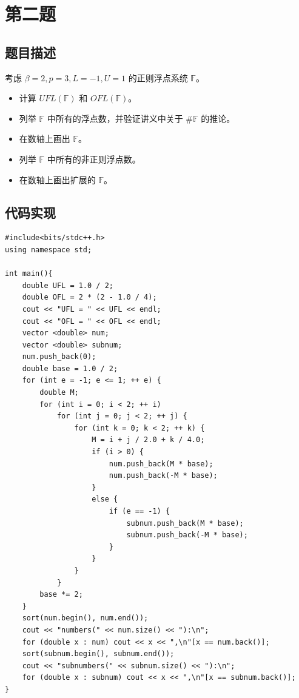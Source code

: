 \documentclass{ctexart}
\begin{document}
\section{第二题}

\subsection{题目描述}
考虑 $\beta=2,p=3,L=-1,U=1$ 的正则浮点系统 $\mathbb{F}$。
\begin{itemize}
\item 计算 $UFL(\mathbb{F})$ 和 $OFL(\mathbb{F})$。
\item 列举 $\mathbb{F}$ 中所有的浮点数，并验证讲义中关于 $\#\mathbb{F}$ 的推论。
\item 在数轴上画出 $\mathbb{F}$。
\item 列举 $\mathbb{F}$ 中所有的非正则浮点数。
\item 在数轴上画出扩展的 $\mathbb{F}$。
\end{itemize}

\subsection{代码实现}
\begin{verbatim}
#include<bits/stdc++.h>
using namespace std;

int main(){
    double UFL = 1.0 / 2;
    double OFL = 2 * (2 - 1.0 / 4);
    cout << "UFL = " << UFL << endl;
    cout << "OFL = " << OFL << endl;
    vector <double> num;
    vector <double> subnum;
    num.push_back(0);
    double base = 1.0 / 2;
    for (int e = -1; e <= 1; ++ e) {
        double M;
        for (int i = 0; i < 2; ++ i)
            for (int j = 0; j < 2; ++ j) {
                for (int k = 0; k < 2; ++ k) {
                    M = i + j / 2.0 + k / 4.0;
                    if (i > 0) {
                        num.push_back(M * base);
                        num.push_back(-M * base);
                    }
                    else {
                        if (e == -1) {
                            subnum.push_back(M * base);
                            subnum.push_back(-M * base);
                        }
                    }
                }
            }
        base *= 2;
    }
    sort(num.begin(), num.end());
    cout << "numbers(" << num.size() << "):\n";
    for (double x : num) cout << x << ",\n"[x == num.back()];
    sort(subnum.begin(), subnum.end());
    cout << "subnumbers(" << subnum.size() << "):\n";
    for (double x : subnum) cout << x << ",\n"[x == subnum.back()];
}
\end{verbatim}
\end{document}
